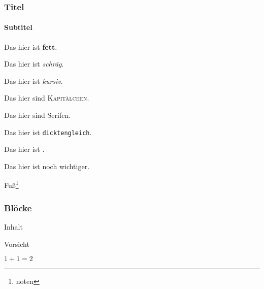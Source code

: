 \begin{frame}
\frametitle{Titel}
\framesubtitle{Subtitel}
\par Das hier ist \textbf{fett}.
\par Das hier ist \textsl{schräg}.
\par Das hier ist \textit{kursiv}.
\par Das hier sind \textsc{Kapitälchen}.
\par Das hier sind \textrm{Serifen}.
\par Das hier ist \texttt{dicktengleich}.
\par Das hier ist .
\par Das hier ist \alert{noch wichtiger}.
\par Fuß\footnote{noten}
\end{frame}


\begin{frame}
\frametitle{Blöcke}

\begin{block}{\vphantom{X}}
Inhalt
\end{block}

\medskip

\begin{alertblock}{\vphantom{X}}
Vorsicht
\end{alertblock}

\medskip

\begin{exampleblock}{\vphantom{X}}
\(1 + 1 = 2\)
\end{exampleblock}
\end{frame}
